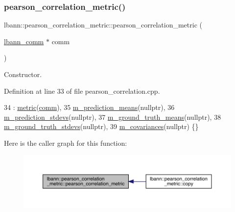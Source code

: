 \subsubsection{\texorpdfstring{pearson\+\_\+correlation\+\_\+metric()}{pearson\_correlation\_metric()}\hspace{0.1cm}{\footnotesize\ttfamily [1/2]}}
{\footnotesize\ttfamily lbann\+::pearson\+\_\+correlation\+\_\+metric\+::pearson\+\_\+correlation\+\_\+metric (\begin{DoxyParamCaption}\item[{\hyperlink{classlbann_1_1lbann__comm}{lbann\+\_\+comm} $\ast$}]{comm }\end{DoxyParamCaption})}

Constructor. 

Definition at line 33 of file pearson\+\_\+correlation.\+cpp.


\begin{DoxyCode}
34   : \hyperlink{classlbann_1_1metric_a3cd2d4f7dcbf94f70b3b8560a3171d9d}{metric}(\hyperlink{file__io_8cpp_ab048c6f9fcbcfaa57ce68b00263dbebe}{comm}),
35     \hyperlink{classlbann_1_1pearson__correlation__metric_ac664eebee2c3d3287848c570400bdddb}{m\_prediction\_means}(\textcolor{keyword}{nullptr}),
36     \hyperlink{classlbann_1_1pearson__correlation__metric_ad288c4206078866feb39a4f982d8e975}{m\_prediction\_stdevs}(\textcolor{keyword}{nullptr}),
37     \hyperlink{classlbann_1_1pearson__correlation__metric_aa67f395597bf6bbf9bd57645877f26a5}{m\_ground\_truth\_means}(\textcolor{keyword}{nullptr}),
38     \hyperlink{classlbann_1_1pearson__correlation__metric_a7ed5e7a1778d17f852f4277afcaa31ed}{m\_ground\_truth\_stdevs}(\textcolor{keyword}{nullptr}),
39     \hyperlink{classlbann_1_1pearson__correlation__metric_aeabb941e22f2718a59103b7ec98a9c1e}{m\_covariances}(\textcolor{keyword}{nullptr}) \{\}
\end{DoxyCode}
Here is the caller graph for this function\+:\nopagebreak
\begin{figure}[H]
\begin{center}
\leavevmode
\includegraphics[width=350pt]{classlbann_1_1pearson__correlation__metric_ac0d93a18b2eb500db51f40311a3b3634_icgraph}
\end{center}
\end{figure}
\mbox{\label{classlbann_1_1pearson__correlation__metric_a52f03d952d693a58d6865b5c62b021af}} 

